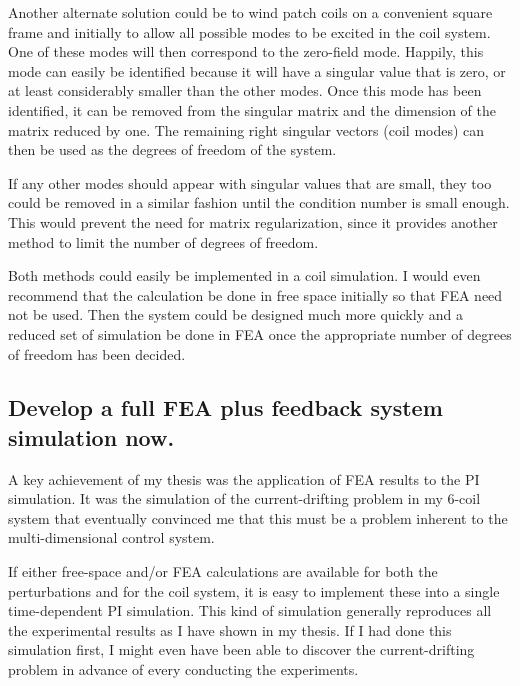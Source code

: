 Another alternate solution could be to wind patch coils on a convenient square frame and initially to allow all possible modes to be excited in the coil system.  One of these modes will then correspond to the zero-field mode.  Happily, this mode can easily be identified because it will have a singular value that is zero, or at least considerably smaller than the other modes.  Once this mode has been identified, it can be removed from the singular matrix and the dimension of the matrix reduced by one.  The remaining right singular vectors (coil modes) can then be used as the degrees of freedom of the system.

If any other modes should appear with singular values that are small, they too could be removed in a similar fashion until the condition number is small enough.  This would prevent the need for matrix regularization, since it provides another method to limit the number of degrees of freedom.

Both methods could easily be implemented in a coil simulation. I would even recommend that the calculation be done in free space initially so that FEA need not be used. Then the system could be designed much more quickly and a reduced set of simulation be done in FEA once the appropriate number of degrees of freedom has been decided.

\subsection{Develop a full FEA plus feedback system simulation now.}

A key achievement of my thesis was the application of FEA results to the PI simulation. It was the simulation of the current-drifting problem in my 6-coil system that eventually convinced me that this must be a problem inherent to the multi-dimensional control system. 

If either free-space and/or FEA calculations are available for both the perturbations and for the coil system, it is easy to implement these into a single time-dependent PI simulation. This kind of simulation generally reproduces all the experimental results as I have shown in my thesis. If I had done this simulation first, I might even have been able to discover the current-drifting problem in advance of every conducting the experiments.


